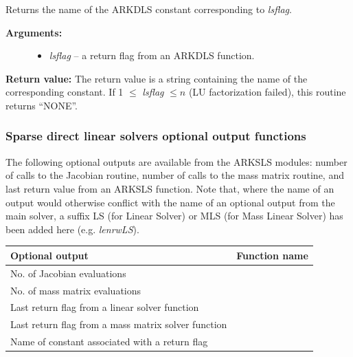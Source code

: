 \documentclass[letterpaper,10pt,english]{sphinxmanual}
\begin{document}
\begin{fulllineitems}
\label{c_interface/User_callable:c.ARKDlsGetReturnFlagName}
Returns the name of the ARKDLS constant
corresponding to \emph{lsflag}.
\begin{description}
\item[{\textbf{Arguments:}}] \leavevmode\begin{itemize}
\item {} 
\emph{lsflag} -- a return flag from an ARKDLS function.

\end{itemize}

\end{description}

\textbf{Return value:}  The return value is a string containing the name of
the corresponding constant. If 1 \(\le\) \emph{lsflag} \(\le
n\) (LU factorization failed), this routine returns ``NONE''.

\end{fulllineitems}



\subsubsection{Sparse direct linear solvers optional output functions}
\label{c_interface/User_callable:sparse-direct-linear-solvers-optional-output-functions}\label{c_interface/User_callable:cinterface-arkslsoutputs}
The following optional outputs are available from the ARKSLS
modules: number of calls to the Jacobian
routine, number of calls to the mass matrix routine, and last return
value from an ARKSLS function.  Note that, where the name of an output
would otherwise conflict with the name of an optional output from the
main solver, a suffix LS (for Linear Solver) or MLS (for Mass Linear
Solver) has been added here (e.g. \emph{lenrwLS}).

\begin{tabulary}{\linewidth}{|L|L|}
\hline
\textsf{\relax 
Optional output
} & \textsf{\relax 
Function name
}\\
\hline
No. of Jacobian evaluations
 & 
{\hyperref[c_interface/User_callable:c.ARKSlsGetNumJacEvals]{\emph{}}}
\\
\hline
No. of mass matrix evaluations
 & 
{\hyperref[c_interface/User_callable:c.ARKSlsGetNumMassEvals]{\emph{}}}
\\
\hline
Last return flag from a linear solver function
 & 
{\hyperref[c_interface/User_callable:c.ARKSlsGetLastFlag]{\emph{}}}
\\
\hline
Last return flag from a mass matrix solver function
 & 
{\hyperref[c_interface/User_callable:c.ARKSlsGetLastMassFlag]{\emph{}}}
\\
\hline
Name of constant associated with a return flag
 & 
{\hyperref[c_interface/User_callable:c.ARKSlsGetReturnFlagName]{\emph{}}}
\\
\hline\end{tabulary}
\end{document}
